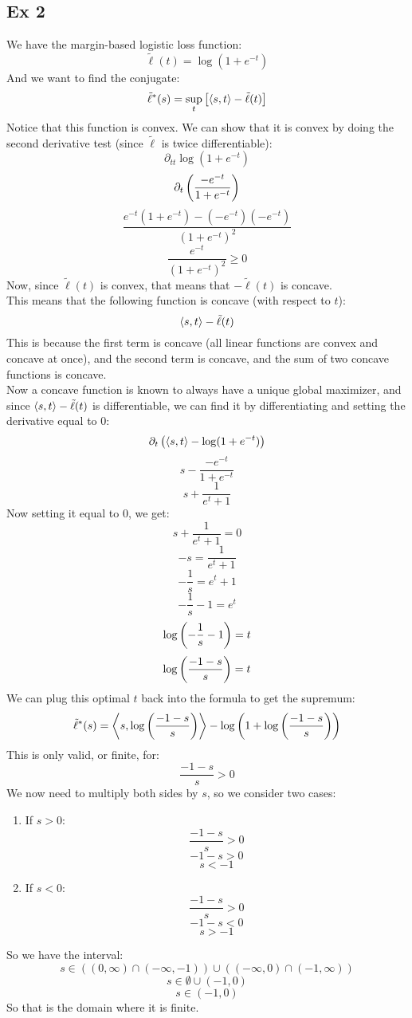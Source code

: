 \documentclass[12pt]{article}
\begin{document}
\newpage

\subsection*{Ex 2}

We have the margin-based logistic loss function:
\[ \tilde{\ell}(t) = \log(1 + e^{-t}) \]
And we want to find the conjugate:
\[ \tilde{\ell}^*(s) = \sup_{t}\left[ \left\langle s, t \right\rangle 
- \tilde{\ell}(t) \right] \]
Notice that this function is convex.
We can show that it is convex by doing the second
derivative test (since $\tilde{\ell}$
is twice differentiable):
\[\partial_{tt}\log(1 + e^{-t}) \]
\[\partial_{t} \left( \dfrac{-e^{-t}}{1 + e^{-t}} \right) \]
\[\dfrac{e^{-t}(1 + e^{-t}) - (-e^{-t})(-e^{-t})}
{(1 + e^{-t})^2}\]
\[\dfrac{e^{-t}}{(1 + e^{-t})^2} \geq 0 \]
Now, since $\tilde{\ell}(t)$
is convex, that means that $-\tilde{\ell}(t)$
is concave. \\
This means that the following function is concave
(with respect to $t$):
\[ \left\langle s, t \right\rangle - \tilde{\ell}(t) \]
This is because the first term is concave
(all linear functions are convex and concave
at once), and the second term is concave,
and the sum of two concave functions is concave. \\
Now a concave function is known to always have
a unique global maximizer, and since 
$\left\langle s, t \right\rangle - \tilde{\ell}(t)$ is differentiable,
we can find it by differentiating and setting
the derivative equal to $0$:
\[ \partial_t\left( \left\langle s, t \right\rangle - \log(1 + e^{-t}) \right) \]
\[ s - \dfrac{-e^{-t}}{1 + e^{-t}} \]
\[ s + \dfrac{1}{e^{t} + 1} \]
Now setting it equal to $0$, we get:
\[ s + \dfrac{1}{e^t + 1} = 0\]
\[ -s = \dfrac{1}{e^t + 1} \]
\[ -\dfrac{1}{s} = e^t + 1 \]
\[ -\dfrac{1}{s} - 1 = e^t \]
\[ \log\left( -\dfrac{1}{s} - 1 \right) = t \]
\[ \log\left( \dfrac{-1 - s}{s} \right) = t \]
We can plug this optimal $t$ back into
the formula to get the supremum:
\[ \tilde{\ell}^*(s)
= \left\langle s, \log\left( \dfrac{-1 - s}{s} \right) \right\rangle
- \log\left( 1+\log\left( \dfrac{-1 - s}{s} \right) \right) \]
This is only valid, or finite, for:
\[ \dfrac{-1 - s}{s} > 0 \]
We now need to multiply both sides by $s$,
so we consider two cases:
\begin{enumerate}
    \item If $s > 0$:
        \[ \dfrac{-1 - s}{s} > 0 \]
        \[ -1 - s > 0 \]
        \[ s < -1 \]
    \item If $s < 0$:
        \[ \dfrac{-1 - s}{s} > 0 \]
        \[ -1-s < 0 \]
        \[ s > -1 \]
\end{enumerate}
So we have the interval:
\[ s \in ((0, \infty) \cap (-\infty, -1))
\cup ((-\infty, 0) \cap (-1, \infty)) \]
\[ s \in \emptyset
\cup (-1, 0) \]
\[ s \in (-1, 0) \]
So that is the domain where it is finite. \\
\end{document}
